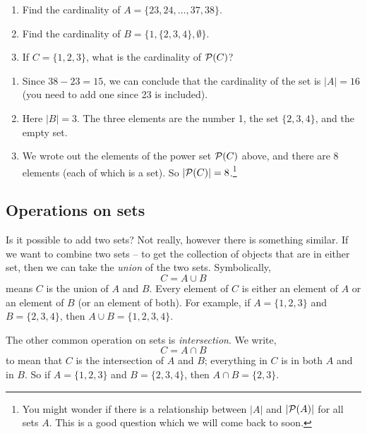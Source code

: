 \documentclass[12pt]{article}
\begin{document}
\begin{example}
\begin{enumerate}
\item Find the cardinality of $A = \{23, 24, \ldots, 37, 38\}$.
\item Find the cardinality of $B = \{1, \{2, 3, 4\}, \emptyset\}$.
\item If $C = \{1,2,3\}$, what is the cardinality of $\mathcal P(C)$?
\end{enumerate}
  
\begin{solution}
\begin{enumerate}
\item Since $38 - 23 = 15$, we can conclude that the cardinality of the set is $|A| = 16$ (you need to add one since 23 is included).
\item Here $|B| = 3$.  The three elements are the number 1, the set $\{2,3,4\}$, and the empty set.  
\item We wrote out the elements of the power set $\mathcal P(C)$ above, and there are 8 elements (each of which is a set).  So $|\mathcal P(C)| = 8$.\footnote{You might wonder if there is a relationship between $|A|$ and $|\mathcal P(A)|$ for all sets $A$.  This is a good question which we will come back to soon.}
\end{enumerate}
 
\end{solution}
\end{example}

\subsection{Operations on sets}

Is it possible to add two sets?  Not really, however there is something similar.  If we want to combine two sets -- to get the collection of objects that are in either set, then we can take the {\em union} of the two sets.  Symbolically,
\[ C = A \cup B\]
means $C$ is the union of $A$ and $B$.  Every element of $C$ is either an element of $A$ or an element of $B$ (or an element of both).  For example, if $A = \{1, 2, 3\}$ and $B = \{2, 3, 4\}$, then $A \cup B = \{1, 2, 3, 4\}$.

The other common operation on sets is {\em intersection}.  We write,
\[ C = A \cap B\]
to mean that $C$ is the intersection of $A$ and $B$; everything in $C$ is in both $A$ and in $B$.  So if $A = \{1, 2, 3\}$ and $B = \{2, 3, 4\}$, then $A \cap B = \{2, 3\}$.  
\end{document}
